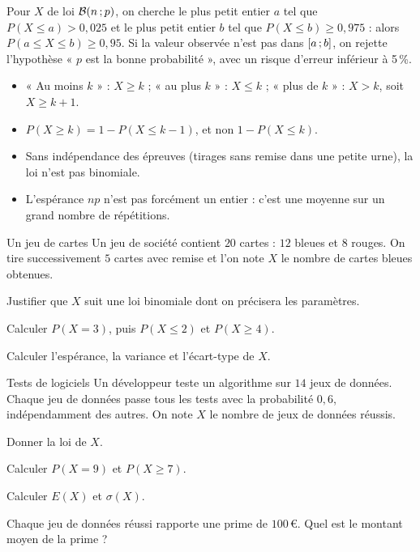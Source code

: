 \begin{savoirfaire}
Pour $X$ de loi $\mathcal{B}(n\,{;}\, p)$, on cherche le plus petit entier $a$ tel que $P(X\leq a)>0{,}025$ et le plus petit entier $b$
tel que $P(X\leq b)\geq0{,}975$ : alors $P(a\leq X\leq b)\geq0{,}95$. Si la valeur observée n'est pas dans $\mathopen{[}a\,{;}\,b\mathclose{]}$, on rejette
l'hypothèse « $p$ est la bonne probabilité », avec un risque d'erreur inférieur à 5\,\%.
\end{savoirfaire}

\begin{attention}
\begin{itemize}[label={\color{otOrange}\textbullet},leftmargin=1.4em,itemsep=0.6mm,topsep=0.5mm]
  \item « Au moins $k$ » : $X\geq k$ ; « au plus $k$ » : $X\leq k$ ; « plus de $k$ » : $X>k$, soit $X\geq k+1$.
  \item $P(X\geq k)=1-P(X\leq k-1)$, et non $1-P(X\leq k)$.
  \item Sans indépendance des épreuves (tirages sans remise dans une petite urne), la loi n'est pas binomiale.
  \item L'espérance $np$ n'est pas forcément un entier : c'est une moyenne sur un grand nombre de répétitions.
\end{itemize}
\end{attention}

\exercices
{}

\begin{exercice}[1]{Un jeu de cartes}
Un jeu de société contient $20$ cartes : $12$ bleues et $8$ rouges. On tire successivement $5$ cartes avec remise et l'on note $X$
le nombre de cartes bleues obtenues.
\begin{questions}
  \item Justifier que $X$ suit une loi binomiale dont on précisera les paramètres.
  \item Calculer $P(X=3)$, puis $P(X\leq2)$ et $P(X\geq4)$.
  \item Calculer l'espérance, la variance et l'écart-type de $X$.
\end{questions}
\end{exercice}

\begin{exercice}[1]{Tests de logiciels}
Un développeur teste un algorithme sur $14$ jeux de données. Chaque jeu de données passe tous les tests avec la probabilité
$0{,}6$, indépendamment des autres. On note $X$ le nombre de jeux de données réussis.
\begin{questions}
  \item Donner la loi de $X$.
  \item Calculer $P(X=9)$ et $P(X\geq7)$.
  \item Calculer $E(X)$ et $\sigma(X)$.
  \item Chaque jeu de données réussi rapporte une prime de $100$\,€. Quel est le montant moyen de la prime ?
\end{questions}
\end{exercice}

